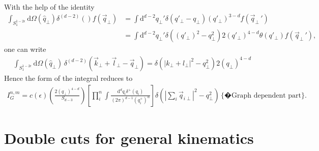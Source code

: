\documentclass[a4paper,11pt]{article}
\numberwithin{equation}{section}
\newcommand{\dd}{\text{d}}
\newcommand{\ldot}{\!\cdot\!}
\newcommand{\eps}{\epsilon}
\begin{document}
With the help of the identity 
\begin{align}
\int_{S_1^{1-2\eps}} \dd \Omega(\hat{q}_\perp)  \delta^{(d-2)}()f(\vec{q}_\perp)
&=
\int \dd^{d-2} q_\perp'  
\delta(q'_\perp-q_\perp)  (q'_\perp)^{3-d}
f(\vec{q}_\perp\,')\\
&= 
\int \dd^{d-2} q_\perp'  
\delta((q'_\perp)^2-q_\perp^2) 2 (q'_\perp)^{4-d}
\theta(q'_\perp)
f(\vec{q}_\perp\,'),
\end{align}
 one can write
\begin{align}
\int_{S_1^{1-2\eps}} \dd \Omega(\hat{q}_\perp)\,   \delta^{(d-2)}( \vec{k}_\perp+ \vec{l}_\perp-
\vec{q}_\perp) =  \delta(|k_\perp+l_\perp |^2-q_\perp^2) 2 (q_\perp)^{4-d}
\end{align}
Hence the form of the integral reduces to 
\begin{align}
I_G^{n,m}= c(\eps) 
\left( \frac{2 (q_\perp)^{4-d}}{S_{d-3}}\right)   \left[ \prod_{i}^n 
\int \frac{\dd^{d} q_i \delta^+(q_i)}
{(2\pi)^{d-1}(q_i^+)^\alpha}\right]
 \delta\left(\left| \sum_i \vec q_{i\perp} \right|^2-q_\perp^2\right) 
 \,\{�\text{Graph dependent part} \} \label{eq:averagedq}.
\end{align}


\section{Double cuts for general kinematics}
\end{document}
